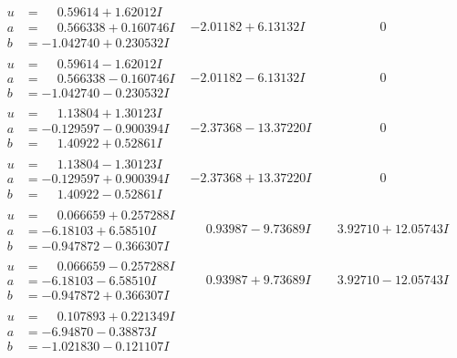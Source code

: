 \documentclass[1p]{elsarticle_modified}
\theoremstyle{definition}
\begin{document}
$$\begin{array}{c|c|c}
\begin{aligned}
u &= \phantom{-}0.59614 + 1.62012 I \\
a &= \phantom{-}0.566338 + 0.160746 I \\
b &= -1.042740 + 0.230532 I\end{aligned}
 & -2.01182 + 6.13132 I & \phantom{-0.000000 } 0 \\ \hline\begin{aligned}
u &= \phantom{-}0.59614 - 1.62012 I \\
a &= \phantom{-}0.566338 - 0.160746 I \\
b &= -1.042740 - 0.230532 I\end{aligned}
 & -2.01182 - 6.13132 I & \phantom{-0.000000 } 0 \\ \hline\begin{aligned}
u &= \phantom{-}1.13804 + 1.30123 I \\
a &= -0.129597 - 0.900394 I \\
b &= \phantom{-}1.40922 + 0.52861 I\end{aligned}
 & -2.37368 - 13.37220 I & \phantom{-0.000000 } 0 \\ \hline\begin{aligned}
u &= \phantom{-}1.13804 - 1.30123 I \\
a &= -0.129597 + 0.900394 I \\
b &= \phantom{-}1.40922 - 0.52861 I\end{aligned}
 & -2.37368 + 13.37220 I & \phantom{-0.000000 } 0 \\ \hline\begin{aligned}
u &= \phantom{-}0.066659 + 0.257288 I \\
a &= -6.18103 + 6.58510 I \\
b &= -0.947872 - 0.366307 I\end{aligned}
 & \phantom{-}0.93987 - 9.73689 I & \phantom{-}3.92710 + 12.05743 I \\ \hline\begin{aligned}
u &= \phantom{-}0.066659 - 0.257288 I \\
a &= -6.18103 - 6.58510 I \\
b &= -0.947872 + 0.366307 I\end{aligned}
 & \phantom{-}0.93987 + 9.73689 I & \phantom{-}3.92710 - 12.05743 I \\ \hline\begin{aligned}
u &= \phantom{-}0.107893 + 0.221349 I \\
a &= -6.94870 - 0.38873 I \\
b &= -1.021830 - 0.121107 I\end{aligned}

\end{array}$$
\end{document}
